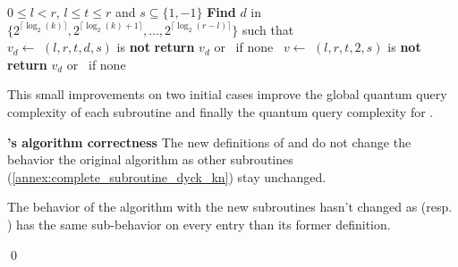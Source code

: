 \begin{algorithm}
    \caption{$\FFP{k}(l,r,t,s)$}\label{alg:ffp_better}
    \begin{algorithmic}
        \Require $0\leq l<r$, $l \leq t \leq r$ and $s \subseteq \{1, -1\}$
        \State \textbf{Find} $d$ in $\{2^{\lceil \log_2(k)\rceil }, 2^{\lceil \log_2(k)+1\rceil },\ldots,2^{\lceil \log_2(r-l)\rceil }\}$
        such that \\
        \hspace*{1cm} $v_d \gets $ $(l,r,t,d,s)$ is \textbf{not} \Null
        \State \textbf{return} $v_d$ or \Null \ if none
        \Else
        \ $v \gets $ $(l,r,t,2,s)$ is \textbf{not} \Null
        \State \textbf{return} $v_d$ or \Null \ if none
        \EndIf
    \end{algorithmic}
\end{algorithm}

This small improvements on two initial cases improve the global
quantum query complexity of each subroutine and finally the quantum
query complexity for .

\begin{theorem}{\textbf{'s algorithm correctness}} \label{th:subroutine_correctness}
    The new definitions of \FA{} and \FFP{} do not change the behavior the original algorithm
    as other subroutines (\autoref{annex:complete_subroutine_dyck_kn}) stay unchanged.
\end{theorem}

\begin{tproof}
    The behavior of the  algorithm with the new subroutines hasn't changed
    as \FA{} (resp. \FF{}) has the same sub-behavior on every entry than its
    former definition.

    \qed
\end{tproof}


